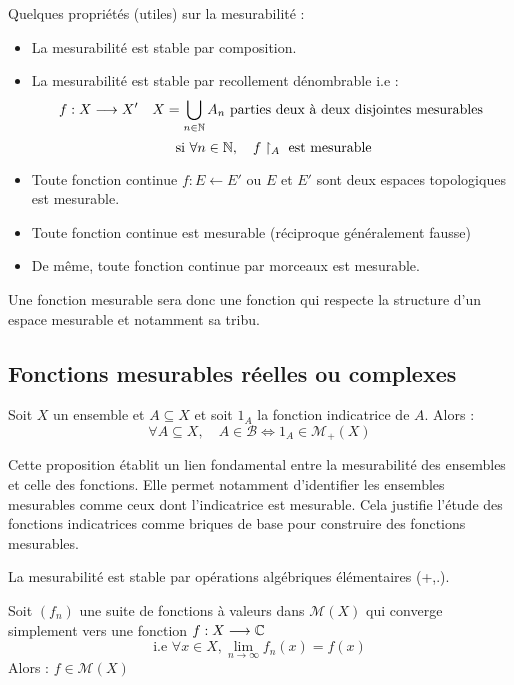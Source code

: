 \begin{prop}[Mesurabilité]
    Quelques propriétés (utiles) sur la mesurabilité :
    \begin{itemize} 
        \item La mesurabilité est stable par composition.
        \item La mesurabilité est stable par recollement dénombrable i.e :
            \[ f : X \longrightarrow X' \quad X = \bigcup_{n \in \mathbb{N}} A_n \text{ parties deux à deux disjointes mesurables} \]
            \[ \text{ si } \forall n \in \mathbb{N}, \quad f \restriction_A \text{ est mesurable} \]
        \item Toute fonction continue $f : E \longleftarrow E'$ ou $E$ et $E'$ sont deux espaces topologiques est mesurable.
        \item Toute fonction continue est mesurable (réciproque généralement fausse)
        \item De même, toute fonction continue par morceaux est mesurable.
    \end{itemize}
\end{prop}

Une fonction mesurable sera donc une fonction qui respecte la structure d'un espace mesurable et notamment 
sa tribu. 

\subsection{Fonctions mesurables réelles ou complexes} 

\begin{prop}
	Soit $X$ un ensemble et $A \subseteq X$ et soit $1_A$ la fonction indicatrice de $A$.
    Alors : 
		\[ \forall A \subseteq X, \quad A \in \mathcal{B} \Longleftrightarrow 1_A \in \mathcal{M}_+(X) \] 
\end{prop}

Cette proposition établit un lien fondamental entre la mesurabilité des ensembles et celle des fonctions.
Elle permet notamment d’identifier les ensembles mesurables comme ceux dont l’indicatrice est mesurable.
Cela justifie l'étude des fonctions indicatrices comme briques de base pour construire des fonctions mesurables.

\begin{theorem}[Stabilité]
	La mesurabilité est stable par opérations algébriques élémentaires (+,.).
\end{theorem} 

\begin{theorem}
	Soit $(f_n)$ une suite de fonctions à valeurs dans $\mathcal{M}(X)$ qui converge simplement vers une fonction $f : X \longrightarrow \mathbb{C}$ 
		\[ \text{i.e } \forall x \in X, \lim_{n\to\infty} f_n(x) = f(x) \]
Alors : $f \in \mathcal{M}(X)$ 
\end{theorem} 

